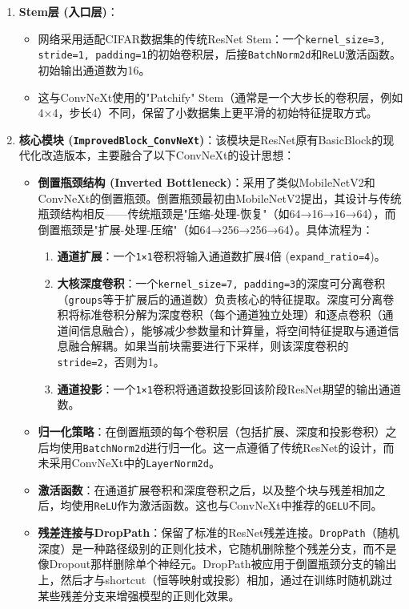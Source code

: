 \documentclass[a4paper]{article}
\begin{document}
\begin{enumerate}
    \item \textbf{Stem层 (入口层)}：
    \begin{itemize}
        \item 网络采用适配CIFAR数据集的传统ResNet Stem：一个\texttt{kernel\_size=3, stride=1, padding=1}的初始卷积层，后接\texttt{BatchNorm2d}和\texttt{ReLU}激活函数。初始输出通道数为16。
        \item 这与ConvNeXt使用的"Patchify" Stem（通常是一个大步长的卷积层，例如4×4，步长4）不同，保留了小数据集上更平滑的初始特征提取方式。
    \end{itemize}
    
    \item \textbf{核心模块 (\texttt{ImprovedBlock\_ConvNeXt})}：该模块是ResNet原有BasicBlock的现代化改造版本，主要融合了以下ConvNeXt的设计思想：
    \begin{itemize}
        \item \textbf{倒置瓶颈结构 (Inverted Bottleneck)}：采用了类似MobileNetV2和ConvNeXt的倒置瓶颈。倒置瓶颈最初由MobileNetV2提出，其设计与传统瓶颈结构相反——传统瓶颈是"压缩-处理-恢复"（如64→16→16→64），而倒置瓶颈是"扩展-处理-压缩"（如64→256→256→64）。具体流程为：
        \begin{enumerate}
            \item \textbf{通道扩展}：一个\texttt{1×1}卷积将输入通道数扩展4倍 (\texttt{expand\_ratio=4})。
            \item \textbf{大核深度卷积}：一个\texttt{kernel\_size=7, padding=3}的深度可分离卷积（\texttt{groups}等于扩展后的通道数）负责核心的特征提取。深度可分离卷积将标准卷积分解为深度卷积（每个通道独立处理）和逐点卷积（通道间信息融合），能够减少参数量和计算量，将空间特征提取与通道信息融合解耦。如果当前块需要进行下采样，则该深度卷积的\texttt{stride=2}，否则为1。
            \item \textbf{通道投影}：一个\texttt{1×1}卷积将通道数投影回该阶段ResNet期望的输出通道数。
        \end{enumerate}
        \item \textbf{归一化策略}：在倒置瓶颈的每个卷积层（包括扩展、深度和投影卷积）之后均使用\texttt{BatchNorm2d}进行归一化。这一点遵循了传统ResNet的设计，而未采用ConvNeXt中的\texttt{LayerNorm2d}。
        \item \textbf{激活函数}：在通道扩展卷积和深度卷积之后，以及整个块与残差相加之后，均使用\texttt{ReLU}作为激活函数。这也与ConvNeXt中推荐的\texttt{GELU}不同。
        \item \textbf{残差连接与DropPath}：保留了标准的ResNet残差连接。\texttt{DropPath}（随机深度）是一种路径级别的正则化技术，它随机删除整个残差分支，而不是像Dropout那样删除单个神经元。DropPath被应用于倒置瓶颈分支的输出上，然后才与shortcut（恒等映射或投影）相加，通过在训练时随机跳过某些残差分支来增强模型的正则化效果。
    \end{itemize}
    

\end{enumerate}
\end{document}
